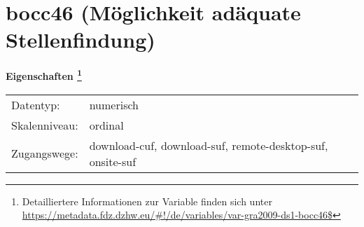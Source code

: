 
    \setcounter{footnote}{0}

    \vspace*{-1.8cm}
	\section{bocc46 (Möglichkeit adäquate Stellenfindung)}
	\label{section:bocc46}



    \vspace*{0.5cm}
    \noindent\textbf{Eigenschaften
	\footnote{Detailliertere Informationen zur Variable finden sich unter
		\url{https://metadata.fdz.dzhw.eu/\#!/de/variables/var-gra2009-ds1-bocc46$}}}\\
	\begin{tabularx}{\hsize}{@{}lX}
	Datentyp: & numerisch \\
	Skalenniveau: & ordinal \\
	Zugangswege: &
	  download-cuf, 
	  download-suf, 
	  remote-desktop-suf, 
	  onsite-suf
 \\
    \end{tabularx}



